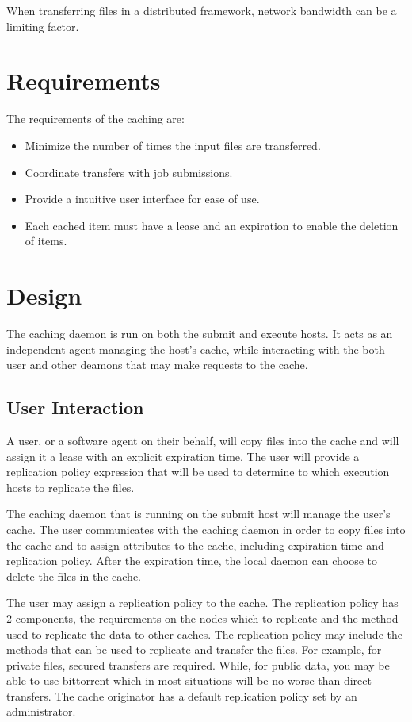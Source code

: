 When transferring files in a distributed framework, network bandwidth can be a limiting factor. 


\section{Requirements}

The requirements of the caching are:
\begin{itemize}
\item Minimize the number of times the input files are transferred.
\item Coordinate transfers with job submissions.
\item Provide a intuitive user interface for ease of use.
\item Each cached item must have a lease and an expiration to enable the deletion of items.
\end{itemize}



\section{Design}

The caching daemon is run on both the submit and execute hosts.  It acts as an independent agent managing the host's cache, while interacting with the both user and other deamons that may make requests to the cache.



\subsection{User Interaction}

A user, or a software agent on their behalf, will copy files into the cache and will assign it a lease with an explicit expiration time.  The user will provide a replication policy expression that will be used to determine to which execution hosts to replicate the files.

The caching daemon that is running on the submit host will manage the user's cache.  The user communicates with the caching daemon in order to copy files into the cache and to assign attributes to the cache, including expiration time and replication policy.  After the expiration time, the local daemon can choose to delete the files in the cache.

The user may assign a replication policy to the cache.  The replication policy has 2 components, the requirements on the nodes which to replicate and the method used to replicate the data to other caches.  The replication policy may include the methods that can be used to replicate and transfer the files.  For example, for private files, secured transfers are required.  While, for public data, you may be able to use bittorrent which in most situations will be no worse than direct transfers.  The cache originator has a default replication policy set by an administrator.

